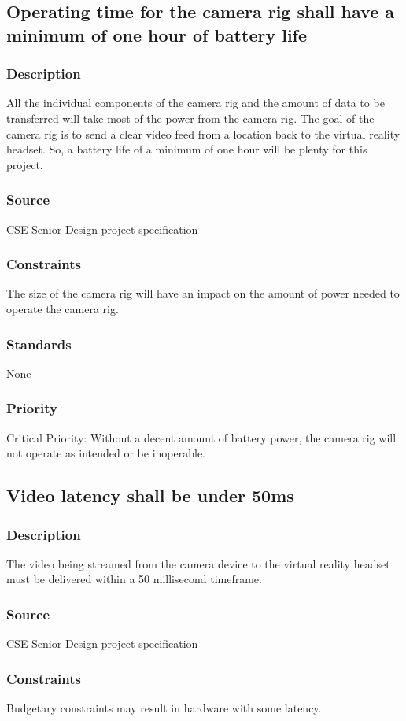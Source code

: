 
\subsection{Operating time for the camera rig shall have a minimum of one hour of battery life}
\subsubsection{Description}
All the individual components of the camera rig and the amount of data to be transferred will take most of the power from the camera rig. The goal of the camera rig is to send a clear video feed from a location back to the virtual reality headset. So, a battery life of a minimum of one hour will be plenty for this project.
\subsubsection{Source}
CSE Senior Design project specification
\subsubsection{Constraints}
The size of the camera rig will have an impact on the amount of power needed to operate the camera rig.
\subsubsection{Standards}
None
\subsubsection{Priority}
Critical Priority: Without a decent amount of battery power, the camera rig will not operate as intended or be inoperable.

\subsection{Video latency shall be under 50ms}
\subsubsection{Description}
The video being streamed from the camera device to the virtual reality headset must be delivered within a 50 millisecond timeframe.
\subsubsection{Source}
CSE Senior Design project specification
\subsubsection{Constraints}
Budgetary constraints may result in hardware with some latency.
